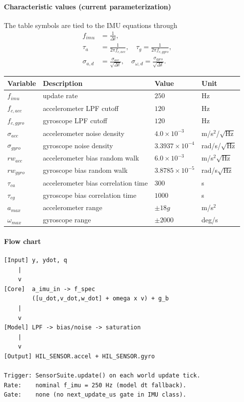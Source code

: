 \documentclass[11pt,a4paper]{article}
\begin{document}
\paragraph{Characteristic values (current parameterization)}
The table symbols are tied to the IMU equations through
\begin{align}
f_{imu} &= \frac{1}{\Delta t}, \\
\tau_a &= \frac{1}{2\pi f_{c,acc}}, \quad \tau_g = \frac{1}{2\pi f_{c,gyro}}, \\
\sigma_{a,d} &= \frac{\sigma_{acc}}{\sqrt{\Delta t}}, \quad \sigma_{\omega,d} = \frac{\sigma_{gyro}}{\sqrt{\Delta t}}.
\end{align}
\begin{center}
\begin{tabular}{llll}
\toprule
Variable & Description & Value & Unit \\
\midrule
$f_{imu}$ & update rate & $250$ & Hz \\
$f_{c,acc}$ & accelerometer LPF cutoff & $120$ & Hz \\
$f_{c,gyro}$ & gyroscope LPF cutoff & $120$ & Hz \\
$\sigma_{acc}$ & accelerometer noise density & $4.0\times10^{-3}$ & m/s$^2$/\(\sqrt{\text{Hz}}\) \\
$\sigma_{gyro}$ & gyroscope noise density & $3.3937\times10^{-4}$ & rad/s/\(\sqrt{\text{Hz}}\) \\
$rw_{acc}$ & accelerometer bias random walk & $6.0\times10^{-3}$ & m/s$^2\sqrt{\text{Hz}}$ \\
$rw_{gyro}$ & gyroscope bias random walk & $3.8785\times10^{-5}$ & rad/s\(\sqrt{\text{Hz}}\) \\
$\tau_{ca}$ & accelerometer bias correlation time & $300$ & s \\
$\tau_{cg}$ & gyroscope bias correlation time & $1000$ & s \\
$a_{max}$ & accelerometer range & $\pm18g$ & m/s$^2$ \\
$\omega_{max}$ & gyroscope range & $\pm2000$ & deg/s \\
\bottomrule
\end{tabular}
\end{center}

\paragraph{Flow chart}
{\footnotesize
\begin{verbatim}
[Input] y, ydot, q
    |
    v
[Core]  a_imu_in -> f_spec
        ([u_dot,v_dot,w_dot] + omega x v) + g_b
    |
    v
[Model] LPF -> bias/noise -> saturation
    |
    v
[Output] HIL_SENSOR.accel + HIL_SENSOR.gyro

Trigger: SensorSuite.update() on each world update tick.
Rate:    nominal f_imu = 250 Hz (model dt fallback).
Gate:    none (no next_update_us gate in IMU class).
\end{verbatim}
}
\end{document}
